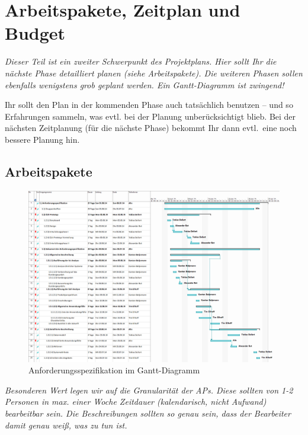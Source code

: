 \documentclass[fontsize=12pt,paper=a4,twoside]{scrartcl}
\begin{document}
\section{Arbeitspakete, Zeitplan und Budget} 
\label{sec:arbeitspaket_zeitplan_budegt}

{\em Dieser Teil ist ein zweiter Schwerpunkt des Projektplans. Hier sollt Ihr die nächste Phase detailliert planen (siehe Arbeitspakete). Die weiteren Phasen sollen ebenfalls wenigstens grob geplant werden. Ein Gantt-Diagramm ist zwingend! 

Ihr sollt den Plan in der kommenden Phase auch tatsächlich benutzen -- und so
  Erfahrungen sammeln, was evtl. bei der Planung unberücksichtigt
  blieb. Bei der nächsten Zeitplanung (für die nächste Phase) bekommt
  Ihr dann evtl.\ eine noch bessere Planung hin.}

\subsection{Arbeitspakete}\label{aps}
\begin{figure}
	\includegraphics[angle = 90, scale=0.5]{as.png}
	\caption{Anforderungsspezifikation im Gantt-Diagramm}
	\label{Gantt-AS}
\end{figure}

{\em Besonderen Wert legen wir auf die Granularität der APs. Diese
  sollten von 1-2 Personen in max. einer Woche Zeitdauer (kalendarisch, nicht
  Aufwand) bearbeitbar sein. Die Beschreibungen sollten so genau sein,
  dass der Bearbeiter damit genau weiß, was zu tun ist.}
  
\end{document}
